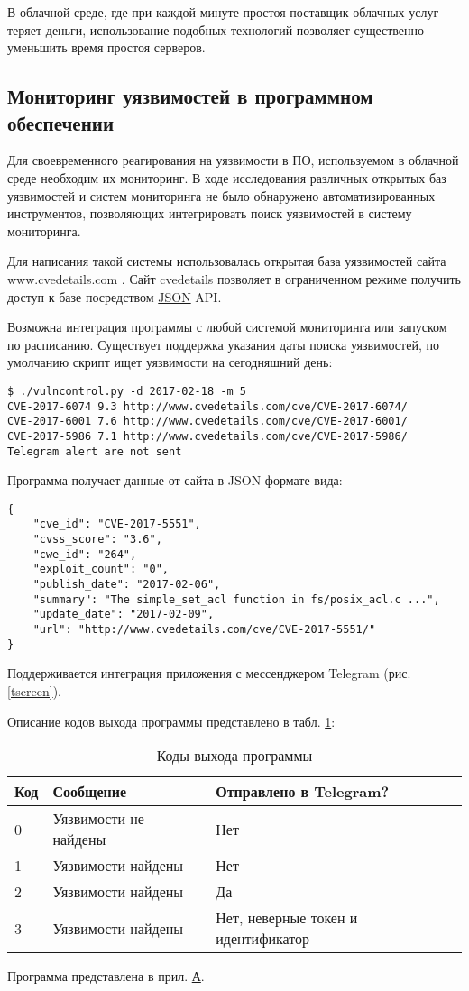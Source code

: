 В облачной среде, где при каждой минуте простоя поставщик облачных услуг теряет деньги, использование подобных технологий позволяет существенно уменьшить время простоя серверов.

\subsection{Мониторинг уязвимостей в программном обеспечении}

Для своевременного реагирования на уязвимости в ПО, используемом в облачной среде необходим их мониторинг.
В ходе исследования различных открытых баз уязвимостей и систем мониторинга не было обнаружено автоматизированных инструментов, позволяющих интегрировать поиск уязвимостей в систему мониторинга.

Для написания такой системы использовалась открытая база уязвимостей сайта www.cvedetails.com \cite{cvedetails}.
Сайт cvedetails позволяет в ограниченном режиме получить доступ к базе посредством \hyperlink{json}{JSON} API.

Возможна интеграция программы с любой системой мониторинга или запуском по расписанию.
Существует поддержка указания даты поиска уязвимостей, по умолчанию скрипт ищет уязвимости на сегодняшний день:
\begin{lstlisting}
$ ./vulncontrol.py -d 2017-02-18 -m 5
CVE-2017-6074 9.3 http://www.cvedetails.com/cve/CVE-2017-6074/
CVE-2017-6001 7.6 http://www.cvedetails.com/cve/CVE-2017-6001/
CVE-2017-5986 7.1 http://www.cvedetails.com/cve/CVE-2017-5986/
Telegram alert are not sent
\end{lstlisting}

Программа получает данные от сайта в JSON-формате вида:
\begin{lstlisting}
{
    "cve_id": "CVE-2017-5551",
    "cvss_score": "3.6",
    "cwe_id": "264",
    "exploit_count": "0",
    "publish_date": "2017-02-06",
    "summary": "The simple_set_acl function in fs/posix_acl.c ...",
    "update_date": "2017-02-09",
    "url": "http://www.cvedetails.com/cve/CVE-2017-5551/"
}
\end{lstlisting}


Поддерживается интеграция приложения с мессенджером Telegram (рис. \ref{tscreen}).


Описание кодов выхода программы представлено в табл. \ref{exitcodes}:
\begin{table}[H]
  \caption{Коды выхода программы}\label{exitcodes}
  \begin{tabular}{|l|l|l|}
  \hline Код & Сообщение & Отправлено в Telegram? \\
  \hline 0 & Уязвимости не найдены & Нет \\
  \hline 1 & Уязвимости найдены & Нет \\
  \hline 2 & Уязвимости найдены & Да \\
  \hline 3 & Уязвимости найдены & Нет, неверные токен и идентификатор \\
  \hline
  \end{tabular}
\end{table}

Программа представлена в прил. \hyperlink{app-a}{А}.

\clearpage
